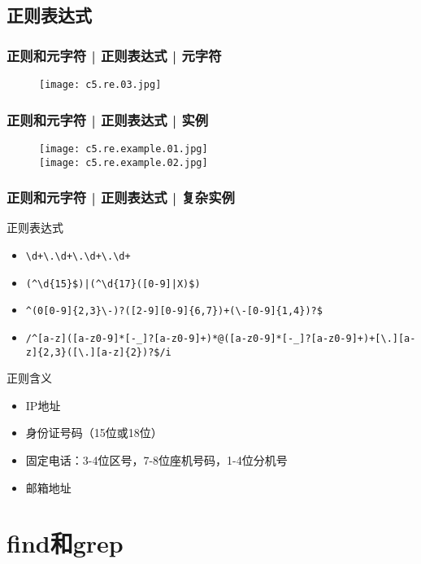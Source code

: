 \subsection{正则表达式}
\begin{frame}
  \frametitle{正则和元字符 | 正则表达式 | 元字符}
  \begin{figure}
    \centering
    \texttt{[image: c5.re.03.jpg]}
  \end{figure}
\end{frame}

\begin{frame}
  \frametitle{正则和元字符 | 正则表达式 | \alert{实例}}
  \begin{figure}
    \centering
    \texttt{[image: c5.re.example.01.jpg]}\\
    \texttt{[image: c5.re.example.02.jpg]}
  \end{figure}
\end{frame}

\begin{frame}[fragile]
  \frametitle{正则和元字符 | 正则表达式 | 复杂实例}
  \begin{block}{正则表达式}
    \begin{itemize}
      \item<2-> \verb|\d+\.\d+\.\d+\.\d+|
      \item<4-> \verb=(^\d{15}$)|(^\d{17}([0-9]|X)$)=
      \item<6-> \verb|^(0[0-9]{2,3}\-)?([2-9][0-9]{6,7})+(\-[0-9]{1,4})?$|
      \item<8-> \verb|/^[a-z]([a-z0-9]*[-_]?[a-z0-9]+)*@([a-z0-9]*[-_]?[a-z0-9]+)+[\.][a-z]{2,3}([\.][a-z]{2})?$/i|
    \end{itemize}
  \end{block}
  \begin{block}{正则含义}
    \begin{itemize}
      \item<3-> IP地址
      \item<5-> 身份证号码（15位或18位）
      \item<7-> 固定电话：3-4位区号，7-8位座机号码，1-4位分机号
      \item<9-> 邮箱地址
    \end{itemize}
  \end{block}
\end{frame}


\section{find和grep}
